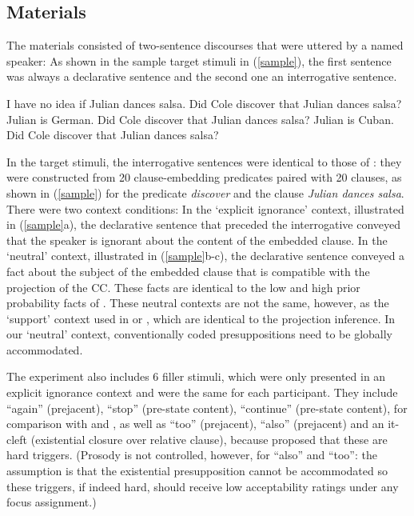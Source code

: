 \documentclass[11pt,fleqn]{article}
\newcommand{\6}{\mbox{$[\hspace*{-.6mm}[$}}
\newcommand{\9}{\mbox{$]\hspace*{-.6mm}]$}}
\begin{document}
\subsection{Materials}

The materials consisted of two-sentence discourses that were uttered by a named speaker: As shown in the sample target stimuli in (\ref{sample}), the first sentence was always a declarative sentence and the second one an interrogative sentence. 

\begin{exe}
\ex\label{sample}
\begin{xlist}
\ex I have no idea if Julian dances salsa. Did Cole discover that Julian dances salsa?
\ex Julian is German. Did Cole discover that Julian dances salsa?
\ex Julian is Cuban. Did Cole discover that Julian dances salsa?
\end{xlist}
\end{exe}

In the target stimuli, the interrogative sentences were identical to those of \citealt{degen-tonhauser-openmind,degen-tonhauser-language}: they were constructed from 20 clause-embedding predicates paired with 20 clauses, as shown in (\ref{sample}) for the predicate {\em discover} and the clause {\em Julian dances salsa}. There were two context conditions: In the `explicit ignorance' context, illustrated in (\ref{sample}a), the declarative sentence that preceded the interrogative conveyed that the speaker is ignorant about the content of the embedded clause. In the `neutral' context, illustrated in (\ref{sample}b-c), the declarative sentence conveyed a fact about the subject of the embedded clause that is compatible with the projection of the CC. These facts are identical to the low and high prior probability facts of \citealt{degen-tonhauser-openmind}. These neutral contexts are not the same, however, as the `support' context used in \citealt{mandelkern-etal2020} or \citealt{kalomoiros-schwarz2021}, which are identical to the projection inference. In our `neutral' context, conventionally coded presuppositions need to be globally accommodated. 


The experiment also includes 6 filler stimuli, which were only presented in an explicit ignorance context and were the same for each participant. They include ``again'' (prejacent), ``stop'' (pre-state content), ``continue'' (pre-state content), for comparison with \citealt{mandelkern-etal2020} and \citealt{kalomoiros-schwarz2021}, as well as ``too'' (prejacent), ``also'' (prejacent) and an it-cleft (existential closure over relative clause), because \citealt{abusch10} proposed that these are hard triggers. (Prosody is not controlled, however, for ``also'' and ``too'': the assumption is that the existential presupposition cannot be accommodated so these triggers, if indeed hard, should receive low acceptability ratings under any focus assignment.)
\end{document}
